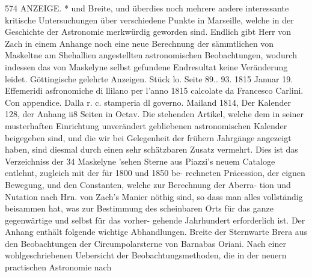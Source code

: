 \documentclass[12pt,a4paper]{article}
\begin{document}
\newpage
574 ANZEIGE. *\newline
und Breite, und überdies noch mehrere andere interessante kritische Untersuchungen über verschiedene\newline
Punkte in Marseille, welche in der Geschichte der Astronomie merkwürdig geworden sind. Endlich\newline
gibt Herr von Zach in einem Anhange noch eine neue Berechnung der sämmtlichen von Maskeltne\newline
am Shehallien angestellten astronomischen Beobachtungen, wodurch indessen das von Maskelyne selbst\newline
gefundene Endresultat keine Veränderung leidet.\newline
Göttingische gelehrte Anzeigen. Stück lo. Seite 89.. 93. 1815 Januar 19.\newline
Effemeridi asfronomiche di llilano per l'anno 1815 calcolate da Francesco Carlini. Con appendice.\newline
Dalla r. c. stamperia dl governo. Mailand 1814, Der Kalender 128, der Anhang ii8 Seiten in Octav.\newline
Die stehenden Artikel, welche dem in seiner musterhaften Einrichtung unverändert gebliebenen\newline
astronomischen Kalender beigegeben sind, und die wir bei Gelegenheit der frühern Jahrgänge angezeigt\newline
haben, sind diesmal durch einen sehr schätzbaren Zusatz vermehrt. Dies ist das Verzeichniss der 34\newline
Maskelyne 'sehen Sterne aus Piazzi's neuem Cataloge entlehnt, zugleich mit der für 1800 und 1850 be-\newline
rechneten Präcession, der eignen Bewegung, und den Constanten, welche zur Berechnung der Aberra-\newline
tion und Nutation nach Hrn. von Zach's Manier nöthig sind, so dass man alles vollständig beisammen\newline
hat, was zur Bestimmung des scheinbaren Orts für das ganze gegenwärtige und selbst für das vorher-\newline
gehende Jahrhundert erforderlich ist. Der Anhang enthält folgende wichtige Abhandlungen. Breite\newline
der Sternwarte Brera aus den Beobachtungen der Circumpolarsterne von Barnabas Oriani. Nach einer\newline
wohlgeschriebenen Uebersicht der Beobachtungsmethoden, die in der neuern practischen Astronomie nach\newline
\end{document}

